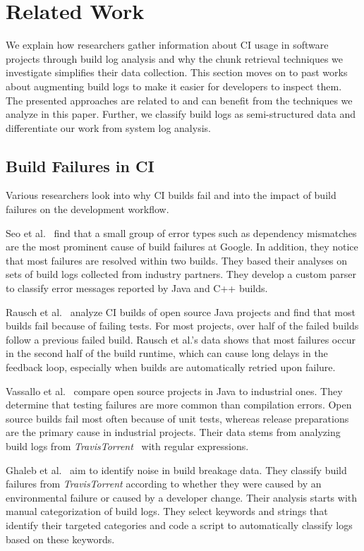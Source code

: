 \section{Related Work}
\label{sec:rw}
We explain how researchers gather information about CI usage in software projects
through build log analysis and why the chunk retrieval techniques we investigate
simplifies their data collection.
This section moves on to past works about augmenting build logs to make it easier
for developers to inspect them.
The presented approaches are related to and can benefit from the techniques we
analyze in this paper.
Further, we classify build logs as semi-structured data and differentiate our
work from system log analysis.

\subsection{Build Failures in CI}
Various researchers look into why CI builds fail and into the impact of build failures on the development workflow.

Seo et al.~\cite{seo2014programmers} find that a small group of error types such as dependency mismatches are the most prominent cause of build failures at Google.
In addition, they notice that most failures are resolved within two builds.
They based their analyses on sets of build logs collected from industry partners.
They develop a custom parser to classify error messages reported by Java and C++ builds.

Rausch et al.~\cite{rausch2017empirical} analyze CI builds of open source Java projects and find that most builds fail because of failing tests.
For most projects, over half of the failed builds follow a previous failed build.
Rausch et al.'s data shows that most failures occur in the second half of the build runtime, which can cause long delays in the feedback loop, especially when builds are automatically retried upon failure.

Vassallo et al.~\cite{vassallo2017a-tale} compare open source projects in Java to industrial ones.
They determine that testing failures are more common than compilation errors.
Open source builds fail most often because of unit tests, whereas release preparations are the primary cause in industrial projects.
Their data stems from analyzing build logs from \emph{TravisTorrent}~\cite{beller2017travistorrent} with regular expressions.

Ghaleb et al.~\cite{ghaleb2019studying} aim to identify noise in build breakage data.
They classify build failures from \emph{TravisTorrent} according to whether they were caused by an environmental failure or caused by a developer change.
Their analysis starts with manual categorization of build logs.
They select keywords and strings that identify their targeted categories and code a script to automatically classify logs based on these keywords.

